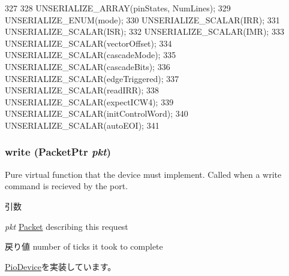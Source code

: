 \begin{DoxyCode}
327 {
328     UNSERIALIZE_ARRAY(pinStates, NumLines);
329     UNSERIALIZE_ENUM(mode);
330     UNSERIALIZE_SCALAR(IRR);
331     UNSERIALIZE_SCALAR(ISR);
332     UNSERIALIZE_SCALAR(IMR);
333     UNSERIALIZE_SCALAR(vectorOffset);
334     UNSERIALIZE_SCALAR(cascadeMode);
335     UNSERIALIZE_SCALAR(cascadeBits);
336     UNSERIALIZE_SCALAR(edgeTriggered);
337     UNSERIALIZE_SCALAR(readIRR);
338     UNSERIALIZE_SCALAR(expectICW4);
339     UNSERIALIZE_SCALAR(initControlWord);
340     UNSERIALIZE_SCALAR(autoEOI);
341 }
\end{DoxyCode}
\hypertarget{classX86ISA_1_1I8259_a4cefab464e72b5dd42c003a0a4341802}{
\subsubsection[{write}]{ write ({\bf PacketPtr} {\em pkt})}}
\label{classX86ISA_1_1I8259_a4cefab464e72b5dd42c003a0a4341802}
Pure virtual function that the device must implement. Called when a write command is recieved by the port. 
\begin{DoxyParams}{引数}
\item[{\em pkt}]\hyperlink{classPacket}{Packet} describing this request \end{DoxyParams}
\begin{DoxyReturn}{戻り値}
number of ticks it took to complete 
\end{DoxyReturn}


\hyperlink{classPioDevice_afe8371668d023bb2516b286e5e399b6f}{PioDevice}を実装しています。


